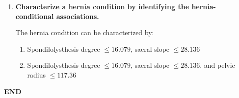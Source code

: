 \documentclass[12pt]{article}
\begin{document}
\begin{enumerate}[leftmargin=\labelsep]
\begin{enumerate}
          \item \textbf{Characterize a hernia condition by identifying the hernia-conditional associations.}

          \vskip 0.3cm

          The hernia condition can be characterized by:
          \begin{enumerate}
            \item Spondilolysthesis degree $\leq 16.079$, sacral slope $\leq 28.136$
            \item Spondilolysthesis degree $\leq 16.079$, sacral slope $\leq 28.136$, and pelvic radius $\leq 117.36$
          \end{enumerate}
          \end{enumerate}
\end{enumerate}

\vskip 1cm
\center\textbf{END}
\end{document}
